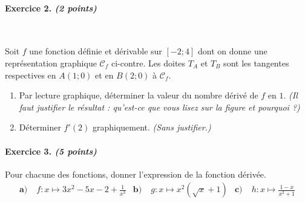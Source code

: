 \documentclass[11pt]{article}
\newcommand{\Cf}{\mathscr C_f}
\begin{document}
\paragraph{Exercice 2. \emph{(2 points)}}~\\
\begin{minipage}{.5\textwidth}
  Soit $f$ une fonction définie et dérivable sur $[-2;4]$ dont on donne une
  représentation graphique $\Cf$ ci-contre. Les doites $T_A$ et $T_B$ sont les
  tangentes respectives en $A(1; 0)$ et en $B(2;0)$ à $\Cf$.
  \begin{enumerate}
    \item Par lecture graphique, déterminer la valeur du nombre dérivé de $f$ en
      $1$. \emph{(Il faut justifier le résultat : qu'est-ce que vous lisez sur
      la figure et pourquoi ?)}
    \item Déterminer $f'(2)$ graphiquement. \emph{(Sans justifier.)}
  \end{enumerate}
\end{minipage}
\begin{minipage}{.5\textwidth}
\begin{center}
\end{center}
\end{minipage}

\paragraph{Exercice 3. \emph{(5 points)}}
Pour chacune des fonctions, donner l'expression de la fonction
dérivée.
\begin{align*}
  \textbf{a)}\; & f:x\mapsto 3x^2-5x-2+\frac{1}{x^3} &
  \textbf{b)}\; & g:x\mapsto x^2(\sqrt x+1) &
  \textbf{c)}\; & h:x\mapsto \frac{1-x}{x^2+1} 
\end{align*}
\end{document}

